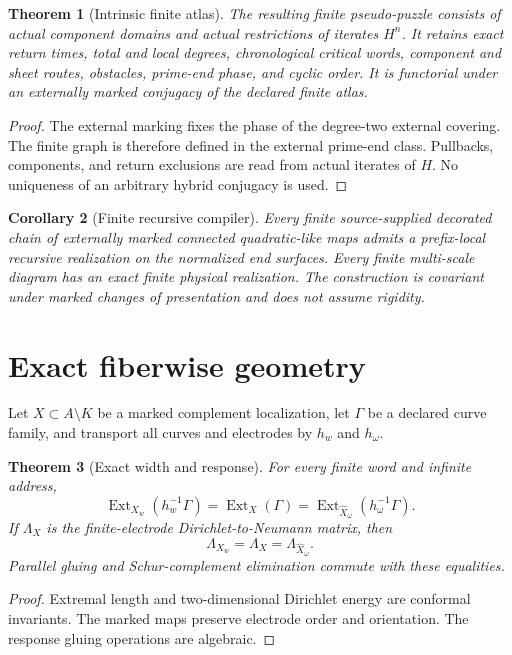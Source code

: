 \documentclass[11pt]{article}
\newtheorem{theorem}{Theorem}[section]
\newtheorem{corollary}[theorem]{Corollary}
\theoremstyle{definition}
\theoremstyle{remark}
\newcommand{\Ext}{\operatorname{Ext}}
\begin{document}
\begin{theorem}[Intrinsic finite atlas]
The resulting finite pseudo-puzzle consists of actual component domains and
actual restrictions of iterates $H^n$.  It retains exact return times, total
and local degrees, chronological critical words, component and sheet routes,
obstacles, prime-end phase, and cyclic order.  It is functorial under an
externally marked conjugacy of the declared finite atlas.
\end{theorem}

\begin{proof}
The external marking fixes the phase of the degree-two external covering.  The
finite graph is therefore defined in the external prime-end class.  Pullbacks,
components, and return exclusions are read from actual iterates of $H$.
No uniqueness of an arbitrary hybrid conjugacy is used.
\end{proof}

\begin{corollary}[Finite recursive compiler]
Every finite source-supplied decorated chain of externally marked connected
quadratic-like maps admits a prefix-local recursive realization on the
normalized end surfaces.  Every finite multi-scale diagram has an exact finite
physical realization.  The construction is covariant under marked changes of
presentation and does not assume rigidity.
\end{corollary}

\section{Exact fiberwise geometry}
Let $X\subset A\setminus K$ be a marked complement localization, let $\Gamma$
be a declared curve family, and transport all curves and electrodes by $h_w$
and $h_\omega$.

\begin{theorem}[Exact width and response]
For every finite word and infinite address,
\[
 \Ext_{X_w}(h_w^{-1}\Gamma)=\Ext_X(\Gamma)
 =\Ext_{\widehat X_\omega}(h_\omega^{-1}\Gamma).
\]
If $\Lambda_X$ is the finite-electrode Dirichlet-to-Neumann matrix, then
\[
 \Lambda_{X_w}=\Lambda_X=\Lambda_{\widehat X_\omega}.
\]
Parallel gluing and Schur-complement elimination commute with these equalities.
\end{theorem}

\begin{proof}
Extremal length and two-dimensional Dirichlet energy are conformal invariants.
The marked maps preserve electrode order and orientation.  The response gluing
operations are algebraic.
\end{proof}
\end{document}
